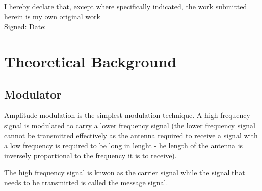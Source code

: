 \documentclass[12pt, a4paper]{article}
\begin{document}
	\begin{titlepage}
		\vspace*{1.5cm}
		\vspace*{1.5cm}
		\vspace*{1.5cm}
		\vspace*{0.5cm}
		\vspace*{0.1cm}
		\vspace*{0.1cm}
		\vspace*{0.1cm}
		\vspace*{0.3cm}
		\makebox[\textwidth]{\today}
		\vfill
		\noindent I hereby declare that, except where specifically indicated, the work submitted herein is my own original work\\
		Signed: \hspace*{5cm} Date:
	\end{titlepage}

	\tableofcontents
	\newpage

\section{Theoretical Background}

	\subsection{Modulator}
		Amplitude modulation is the simplest modulation technique. A high frequency signal is modulated to carry a lower frequency signal (the lower frequency signal cannot be transmitted effectively as the antenna required to receive a signal with a low frequency is required to be long in lenght - he length of the antenna is inversely proportional to the frequency it is to receive).

		The high frequency signal is knwon as the carrier signal while the signal that needs to be transmitted is called the message signal. 
\end{document}
